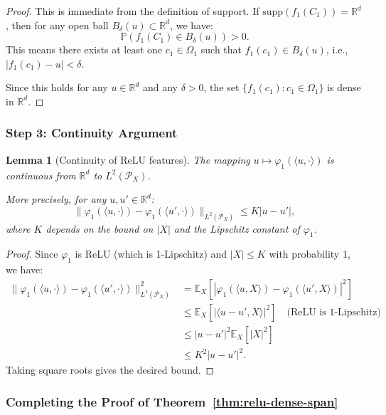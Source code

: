 \documentclass[11pt]{article}
\newcommand{\1}{\mathbbm{1}}
\newtheorem{lemma}{Lemma}
\begin{document}
\begin{proof}
This is immediate from the definition of support. If $\text{supp}(f_1(C_1)) = \mathbb{R}^d$, then for any open ball $B_\delta(u) \subset \mathbb{R}^d$, we have:
\[
\mathbb{P}(f_1(C_1) \in B_\delta(u)) > 0.
\]
This means there exists at least one $c_1 \in \Omega_1$ such that $f_1(c_1) \in B_\delta(u)$, i.e., $|f_1(c_1) - u| < \delta$.

Since this holds for any $u \in \mathbb{R}^d$ and any $\delta > 0$, the set $\{f_1(c_1) : c_1 \in \Omega_1\}$ is dense in $\mathbb{R}^d$.
\end{proof}

\subsubsection{Step 3: Continuity Argument}

\begin{lemma}[Continuity of ReLU features]
\label{lem:continuity-relu}
The mapping $u \mapsto \varphi_1(\langle u, \cdot\rangle)$ is continuous from $\mathbb{R}^d$ to $L^2(\mathcal{P}_X)$.

More precisely, for any $u, u' \in \mathbb{R}^d$:
\[
\|\varphi_1(\langle u, \cdot\rangle) - \varphi_1(\langle u', \cdot\rangle)\|_{L^2(\mathcal{P}_X)} \le K |u - u'|,
\]
where $K$ depends on the bound on $|X|$ and the Lipschitz constant of $\varphi_1$.
\end{lemma}

\begin{proof}
Since $\varphi_1$ is ReLU (which is 1-Lipschitz) and $|X| \le K$ with probability 1, we have:
\begin{align*}
\|\varphi_1(\langle u, \cdot\rangle) - \varphi_1(\langle u', \cdot\rangle)\|_{L^2(\mathcal{P}_X)}^2 
&= \mathbb{E}_X[|\varphi_1(\langle u, X\rangle) - \varphi_1(\langle u', X\rangle)|^2]\\
&\le \mathbb{E}_X[|\langle u - u', X\rangle|^2] \quad \text{(ReLU is 1-Lipschitz)}\\
&\le |u - u'|^2 \mathbb{E}_X[|X|^2]\\
&\le K^2 |u - u'|^2.
\end{align*}
Taking square roots gives the desired bound.
\end{proof}

\subsubsection{Completing the Proof of Theorem~\ref{thm:relu-dense-span}}
\end{document}
